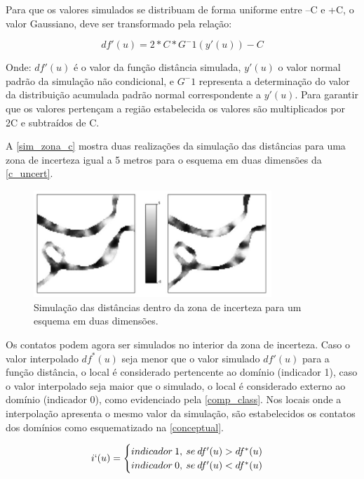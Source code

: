 Para que os valores simulados se distribuam de forma uniforme entre –C e +C, o valor Gaussiano, deve ser transformado pela relação:

\begin{equation}
\label{sim_trans}
    df'(u)=2*C*G^-1(y'(u))-C
\end{equation}

Onde: $df'(u)$ é o valor da função distância simulada, $y'(u)$ o valor normal padrão da simulação não condicional, e $G^-1$ representa a determinação do valor da distribuição acumulada padrão normal correspondente a $y'(u)$. Para garantir que os valores pertençam a região estabelecida os valores são multiplicados por 2C e subtraídos de C.

A \autoref{sim_zona_c} mostra duas realizações da simulação das distâncias para uma zona de incerteza igual a 5 metros para o esquema em duas dimensões da \autoref{c_uncert}.

\begin{figure}[H]
	\caption{\label{sim_zona_c}Simulação das distâncias dentro da zona de incerteza para um esquema em duas dimensões.}
	\centering
		\includegraphics[width=0.8\textwidth]{capitulo_2/imagens/sim_zona_c.png}
\end{figure}

Os contatos podem agora ser simulados no interior da zona de incerteza. Caso o valor interpolado $df^{*}(u)$ seja menor que o valor simulado $df'(u)$ para a função distância, o local é considerado pertencente ao domínio (indicador 1), caso o valor interpolado seja maior que o simulado, o local é considerado externo ao domínio (indicador 0), como evidenciado pela \autoref{comp_class}. Nos locais onde a interpolação apresenta o mesmo valor da simulação, são estabelecidos os contatos dos domínios como esquematizado na \autoref{conceptual}.

\begin{equation}
\label{comp_class}
	i`(u)=\begin{cases}
	indicador \: 1, \: se \: df'(u) > df^{*}(u)\\
	indicador \: 0, \: se \: df'(u) < df^{*}(u)\end{cases}
\end{equation}

